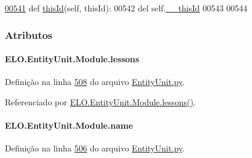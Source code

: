\begin{DoxyCode}
\hypertarget{classELO_1_1EntityUnit_1_1Module_l00541}{}\hyperlink{classELO_1_1EntityUnit_1_1Module_abb18c92b2cbb1ee72b45522a47cf70d9}{00541}     \textcolor{keyword}{def }\hyperlink{classELO_1_1EntityUnit_1_1Module_a02fe16e41dd435364cb9073a8a805e96}{thisId}(self, thisId):
00542         del self.\hyperlink{classELO_1_1EntityUnit_1_1Module_acbfbba7b325888f7714ceb8df1ff3488}{\_\_thisId}
00543 
00544 
\end{DoxyCode}


\subsubsection{Atributos}
\hypertarget{classELO_1_1EntityUnit_1_1Module_a33eacfd2527f80841b87ccd73eb5fec0}{}
\paragraph[{lessons}]{\setlength{\rightskip}{0pt plus 5cm}E\+L\+O.\+Entity\+Unit.\+Module.\+lessons}\label{classELO_1_1EntityUnit_1_1Module_a33eacfd2527f80841b87ccd73eb5fec0}


Definição na linha \hyperlink{EntityUnit_8py_source_l00508}{508} do arquivo \hyperlink{EntityUnit_8py_source}{Entity\+Unit.\+py}.



Referenciado por \hyperlink{classELO_1_1EntityUnit_1_1Module_a2ae2bada0ae6fef2a288206b32ada74e}{E\+L\+O.\+Entity\+Unit.\+Module.\+lessons()}.

\hypertarget{classELO_1_1EntityUnit_1_1Module_a82adf3b2602714a4df5f0df535902854}{}
\paragraph[{name}]{\setlength{\rightskip}{0pt plus 5cm}E\+L\+O.\+Entity\+Unit.\+Module.\+name}\label{classELO_1_1EntityUnit_1_1Module_a82adf3b2602714a4df5f0df535902854}


Definição na linha \hyperlink{EntityUnit_8py_source_l00506}{506} do arquivo \hyperlink{EntityUnit_8py_source}{Entity\+Unit.\+py}.



